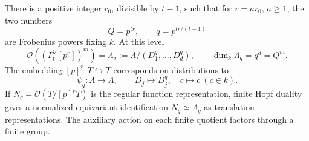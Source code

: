 \begin{lemma}\label{rings:dual-distribution}
There is a positive integer $r_0$, divisible by $t-1$, such
that for $r=ar_0$, $a\geq1$, the two numbers
\begin{equation}\label{rings:two-frobenius-indices}
 Q=p^{tr},\qquad q=p^{tr/(t-1)}
\end{equation}
are Frobenius powers fixing $k$.  At this level
\[
 \mathcal O((\Gamma_t^\vee[p^r])^m)
   =\Lambda_q:=\Lambda/(D_1^q,\ldots,D_d^q),
 \qquad
 \dim_k\Lambda_q=q^d=Q^m.
\]
The embedding $[p]^r:T\hookrightarrow T$ corresponds on
distributions to
\[
 \psi_q:\Lambda\longrightarrow\Lambda,
 \qquad D_j\longmapsto D_j^q,\quad c\longmapsto c\ (c\in k).
\]
If $N_q=\mathcal O(T/[p]^rT)$ is the regular function
representation, finite Hopf duality gives a normalized
equivariant identification $N_q\simeq\Lambda_q$ as
translation representations.  The auxiliary action on
each finite quotient factors through a finite group.
\end{lemma}

